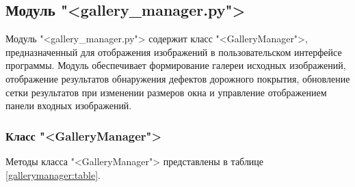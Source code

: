 \renewcommand{\arraystretch}{1.0}


\subsection{Модуль "<gallery\_manager.py">}

Модуль "<gallery\_manager.py"> содержит класс "<GalleryManager">, предназначенный для отображения изображений в пользовательском интерфейсе программы. Модуль обеспечивает формирование галереи исходных изображений, отображение результатов обнаружения дефектов дорожного покрытия, обновление сетки результатов при изменении размеров окна и управление отображением панели входных изображений.

\subsubsection{Класс "<GalleryManager">}

Методы класса "<GalleryManager"> представлены в таблице \ref{gallerymanager:table}.


